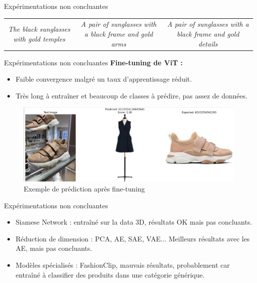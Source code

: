 \documentclass{beamer}
\begin{document}
\begin{frame}{Expérimentations non concluantes}
\begin{table}[h]
{\begin{tabular}{c c c}
        \parbox{0.3\textwidth}{\centering \large \textit{The black sunglasses with gold temples}} & 
        \parbox{0.3\textwidth}{\centering \large \textit{A pair of sunglasses with a black frame and gold arms}} & 
        \parbox{0.3\textwidth}{\centering \large \textit{A pair of sunglasses with a black frame and gold details}} \\ 
    \end{tabular}%
    }
\end{table}
\end{frame}

\begin{frame}{Expérimentations non concluantes}
\textbf{Fine-tuning de ViT :}
\begin{itemize}
        \item Faible convergence malgré un taux d'apprentissage réduit.
        \item Très long à entraîner et beaucoup de classes à prédire, pas assez de données.
\end{itemize}

\vspace{0.5cm}

\begin{figure}[h]
    \centering
    \includegraphics[width=1\textwidth]{assets/finetuning_vit.png}
    \caption{Exemple de prédiction après fine-tuning}
\end{figure}
\end{frame}

\begin{frame}{Expérimentations non concluantes}
    \begin{itemize}
            \item Siamese Network : entraîné sur la data 3D, résultats OK mais pas concluants.
            \item Réduction de dimension : PCA, AE, SAE, VAE... Meilleurs résultats avec les AE, mais pas concluants.
            \item Modèles spécialisés : FashionClip, mauvais résultats, probablement car entraîné à classifier des produits dans une catégorie générique.
    \end{itemize}

\end{frame}
\end{document}
